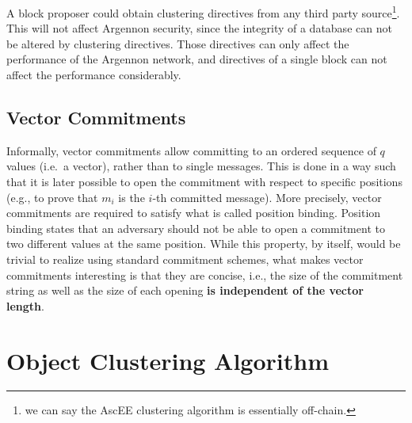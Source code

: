 A block proposer could obtain clustering directives from any third party source\footnote{we can say the AscEE clustering
algorithm is essentially off-chain.}. This will not
affect Argennon security, since the integrity of a database can not be altered by clustering directives.
Those directives can only affect the performance of the Argennon network, and directives of a single block can
not affect the performance considerably.

\subsection{Vector Commitments}\label{subsec:impl-zk-edbs}

Informally, vector commitments allow committing to an ordered sequence of $q$ values
(i.e.\ a vector), rather than to single messages. This is done in a way such that it is later possible
to open the commitment with respect to specific positions (e.g., to prove that $m_i$ is the $i$-th committed
message). More precisely, vector commitments are required to satisfy what is called position binding.
Position binding states that an adversary should not be able to open a commitment to two different
values at the same position. While this property, by itself, would be trivial to realize using standard
commitment schemes, what makes vector commitments interesting is that they are concise, i.e.,
the size of the commitment string as well as the size of each opening \textbf{is independent of the
vector length}.



\section{Object Clustering Algorithm}\label{sec:clustering}




